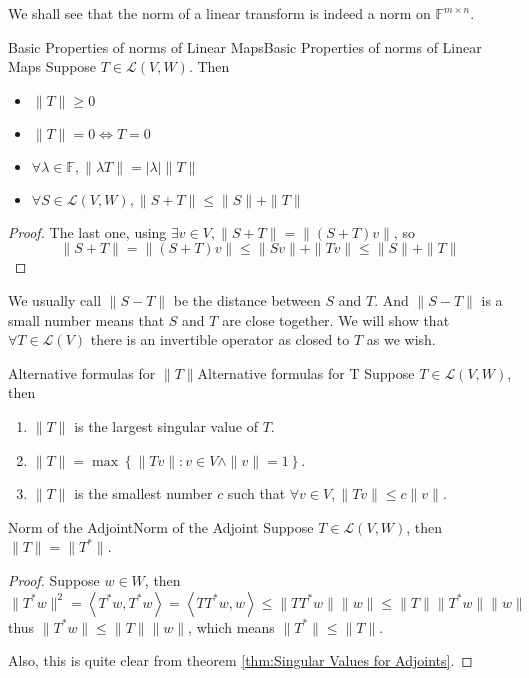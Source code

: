 \documentclass[../main.tex]{subfiles}
\begin{document}
We shall see that the norm of a linear transform is indeed a norm on $\mathbb{F}^{m \times n}$.

\begin{theorem}{Basic Properties of norms of Linear Maps}{Basic Properties of norms of Linear Maps}
Suppose $T\in \mathscr{L}(V,W)$. Then
\begin{itemize}
\item $\|T\| \geq 0$
\item $\|T\|=0 \Leftrightarrow T=0$ 
\item $\forall  \lambda\in \mathbb{F},\|\lambda T\| = \left|\lambda\right|\|T\|$
\item $\forall S\in \mathscr{L}(V,W), \|S+T\| \leq \|S\| + \|T\|$
\end{itemize}
\end{theorem}
\begin{proof}
The last one, using $\exists v\in V, \|S+T\| = \|(S+T)v\|$, so
\begin{equation*}
\|S+T\| = \|(S+T)v\| \leq \|Sv\|+\|Tv\| \leq \|S\|+\|T\|
\end{equation*}
\end{proof}

We usually call $\|S-T\|$ be the distance between $S$ and $T$. And $\|S-T\|$ is a small number means that $S$ and $T$ are close together. We will show that $\forall T\in \mathscr{L}(V)$ there is an invertible operator as closed to $T$ as we wish.

\begin{theorem}{Alternative formulas for $\|T\|$}{Alternative formulas for T}
Suppose $T\in \mathscr{L}(V,W)$, then
\begin{enumerate}
	\item $\|T\|$ is the largest singular value of $T$.
	\item $\|T\| = \max \left\{ \|Tv\|:v\in V\land \|v\|=1 \right\}$.
	\item $\|T\|$ is the smallest number $c$ such that $\forall v\in V,\|Tv\| \leq c \|v\|$.
\end{enumerate}
\end{theorem}


\begin{theorem}{Norm of the Adjoint}{Norm of the Adjoint}
Suppose $T\in \mathscr{L}(V,W)$, then $\|T\| = \|T^*\|$.
\end{theorem}
\begin{proof}
Suppose $w\in W$, then
\begin{equation*}
\|T^*w\|^2 = \left<T^*w,T^*w\right> = \left<T T^*w,w\right> \leq \|T T^*w\| \|w\| \leq \|T\| \|T^*w\| \|w\|
\end{equation*}
thus $\|T^*w\| \leq \|T\|\|w\|$, which means $\|T^*\| \leq \|T\|$.

Also, this is quite clear from theorem \ref{thm:Singular Values for Adjoints}.
\end{proof}
\end{document}
